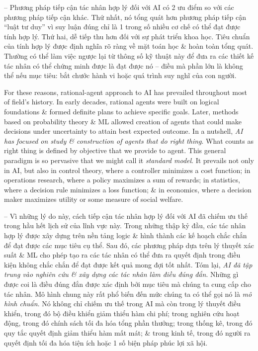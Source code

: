 \documentclass{article}
\begin{document}
\begin{itemize}
\begin{itemize}
\begin{itemize}
\begin{itemize}
				-- Phương pháp tiếp cận tác nhân hợp lý đối với AI có 2 ưu điểm so với các phương pháp tiếp cận khác. Thứ nhất, nó tổng quát hơn phương pháp tiếp cận ``luật tư duy'' vì suy luận đúng chỉ là 1 trong số nhiều cơ chế có thể đạt được tính hợp lý. Thứ hai, dễ tiếp thu hơn đối với sự phát triển khoa học. Tiêu chuẩn của tính hợp lý được định nghĩa rõ ràng về mặt toán học \& hoàn toàn tổng quát. Thường có thể làm việc ngược lại từ thông số kỹ thuật này để đưa ra các thiết kế tác nhân có thể chứng minh được là đạt được nó -- điều mà phần lớn là không thể nếu mục tiêu: bắt chước hành vi hoặc quá trình suy nghĩ của con người.
				
				For these reasons, rational-agent approach to AI has prevailed throughout most of field's history. In early decades, rational agents were built on logical foundations \& formed definite plans to achieve specific goals. Later, methods based on probability theory \& ML allowed creation of agents that could make decisions under uncertainty to attain best expected outcome. In a nutshell, {\it AI has focused on study \& construction of agents that do right thing}. What counts as right thing is defined by objective that we provide to agent. This general paradigm is so pervasive that we might call it {\it standard model}. It prevails not only in AI, but also in control theory, where a controller minimizes a cost function; in operations research, where a policy maximizes a sum of rewards; in statistics, where a decision rule minimizes a loss function; \& in economics, where a decision maker maximizes utility or some measure of social welfare.
				
				-- Vì những lý do này, cách tiếp cận tác nhân hợp lý đối với AI đã chiếm ưu thế trong hầu hết lịch sử của lĩnh vực này. Trong những thập kỷ đầu, các tác nhân hợp lý được xây dựng trên nền tảng logic \& hình thành các kế hoạch chắc chắn để đạt được các mục tiêu cụ thể. Sau đó, các phương pháp dựa trên lý thuyết xác suất \& ML cho phép tạo ra các tác nhân có thể đưa ra quyết định trong điều kiện không chắc chắn để đạt được kết quả mong đợi tốt nhất. Tóm lại, {\it AI đã tập trung vào nghiên cứu \& xây dựng các tác nhân làm điều đúng đắn}. Những gì được coi là điều đúng đắn được xác định bởi mục tiêu mà chúng ta cung cấp cho tác nhân. Mô hình chung này rất phổ biến đến mức chúng ta có thể gọi nó là {\it mô hình chuẩn}. Nó không chỉ chiếm ưu thế trong AI mà còn trong lý thuyết điều khiển, trong đó bộ điều khiển giảm thiểu hàm chi phí; trong nghiên cứu hoạt động, trong đó chính sách tối đa hóa tổng phần thưởng; trong thống kê, trong đó quy tắc quyết định giảm thiểu hàm mất mát; \& trong kinh tế, trong đó người ra quyết định tối đa hóa tiện ích hoặc 1 số biện pháp phúc lợi xã hội.
				

\end{itemize}
\end{itemize}
\end{itemize}
\end{itemize}
\end{document}

